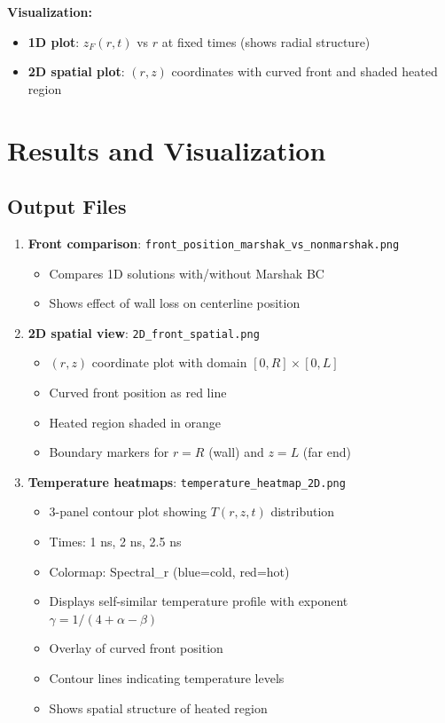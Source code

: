\documentclass[12pt,a4paper]{article}
\begin{document}
\textbf{Visualization:}
\begin{itemize}
    \item \textbf{1D plot}: $z_F(r,t)$ vs $r$ at fixed times (shows radial structure)
    \item \textbf{2D spatial plot}: $(r,z)$ coordinates with curved front and shaded heated region
\end{itemize}

\section{Results and Visualization}

\subsection{Output Files}

\begin{enumerate}
    \item \textbf{Front comparison}: \texttt{front\_position\_marshak\_vs\_nonmarshak.png}
    \begin{itemize}
        \item Compares 1D solutions with/without Marshak BC
        \item Shows effect of wall loss on centerline position
    \end{itemize}
    
    \item \textbf{2D spatial view}: \texttt{2D\_front\_spatial.png}
    \begin{itemize}
        \item $(r,z)$ coordinate plot with domain $[0,R] \times [0,L]$
        \item Curved front position as red line
        \item Heated region shaded in orange
        \item Boundary markers for $r=R$ (wall) and $z=L$ (far end)
    \end{itemize}
    
    \item \textbf{Temperature heatmaps}: \texttt{temperature\_heatmap\_2D.png}
    \begin{itemize}
        \item 3-panel contour plot showing $T(r,z,t)$ distribution
        \item Times: 1 ns, 2 ns, 2.5 ns
        \item Colormap: Spectral\_r (blue=cold, red=hot)
        \item Displays self-similar temperature profile with exponent $\gamma = 1/(4+\alpha-\beta)$
        \item Overlay of curved front position
        \item Contour lines indicating temperature levels
        \item Shows spatial structure of heated region
    \end{itemize}
\end{enumerate}
\end{document}
